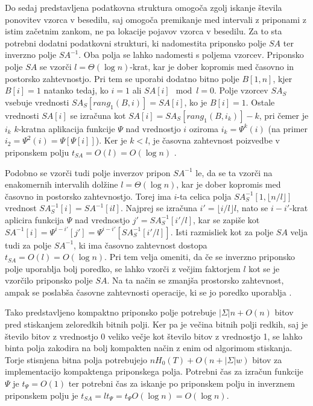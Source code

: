 Do sedaj predstavljena podatkovna struktura omogoča zgolj iskanje števila ponovitev vzorca v besedilu, saj omogoča premikanje med intervali z priponami z istim začetnim zankom, ne pa lokacije pojavov vzorca v besedilu. Za to sta potrebni dodatni podatkovni strukturi, ki nadomestita priponsko polje $SA$ ter inverzno polje $SA^{-1}$. Oba polja se lahko nadomesti s poljema vzorcev. Priponsko polje $SA$ se vzorči $l=\Theta(\log{n})$-krat, kar je dober kopromis med časovno in postorsko zahtevnostjo. Pri tem se uporabi dodatno bitno polje $B[1,n]$, kjer $B[i]=1$ natanko tedaj, ko $i=1$ ali $SA[i]\mod{l} =0$. Polje vzorcev $SA_S$ vsebuje vrednosti $SA_S[rang_1(B,i)]=SA[i]$, ko je $B[i]=1$. Ostale vrednosti $SA[i]$ se izračuna kot $SA[i]=SA_S[rang_1(B,i_k)]-k$, pri čemer je $i_k$ $k$-kratna aplikacija funkcije $\Psi$ nad vrednostjo $i$ oziroma $i_k=\Psi^k(i)$ (na primer $i_2=\Psi^2(i)=\Psi[\Psi[i]]$). Ker je $k< l$, je časovna zahtevnost poizvedbe v priponskem polju $t_{SA}=O(l)=O(\log{n})$ \cite{Navarro2016}.

Podobno se vzorči tudi polje inverzov pripon $SA^{-1}$ le, da se ta vzorči na enakomernih intervalih dolžine $l=\Theta(\log{n})$, kar je dober kopromis med časovno in postorsko zahtevnostjo. Torej ima $i$-ta celica polja $SA^{-1}_S[1,\lfloor n/l\rfloor]$ vrednost $SA^{-1}_S[i]=SA^{-1}[il]$. Najprej se izračuna $i'=\lfloor i/l\rfloor l$, nato se $i-i'$-krat aplicira funkcija $\Psi$ nad vrednostjo $j'=SA^{-1}_S[i'/l]$, kar se zapiše kot $SA^{-1}[i]=\Psi^{i-i'}[j']=\Psi^{i-i'}[SA^{-1}_S[i'/l]]$. Isti razmisliek kot za polje $SA$ velja tudi za polje $SA^{-1}$, ki ima časovno zahtevnost dostopa $t_{SA}=O(l)=O(\log{n})$. Pri tem velja omeniti, da če se inverzno priponsko polje uporablja bolj poredko, se lahko vzorči z večjim faktorjem $l$ kot se je vzorčilo priponsko polje $SA$. Na ta način se zmanjša prostorsko zahtevnost, ampak se poslabša časovne zahtevnosti operacije, ki se jo poredko uporablja \cite{Navarro2016}.

Tako predstavljeno kompaktno priponsko polje potrebuje $|\Sigma|n + O(n)$ bitov pred stiskanjem zeloredkih bitnih polji. Ker pa je večina bitnih polji redkih, saj je število bitov z vrednostjo 0 veliko večje kot število bitov z vrednostjo 1, se lahko binta polja zakodira na bolj kompakten način z enim od algorimom stiskanja. Torje stisnjena bitna polja potrebujejo $nH_0(T)+O(n+|\Sigma|w)$ bitov za implementacijo kompaktenga priponskega polja. Potrebni čas za izračun funkcije $\Psi$ je $t_\Psi=O(1)$ ter potrebni čas za iskanje po priponskem polju in inverznem priponskem polju je $t_{SA}=lt_\Psi = t_\Psi O(\log{n}) = O(\log{n})$.


